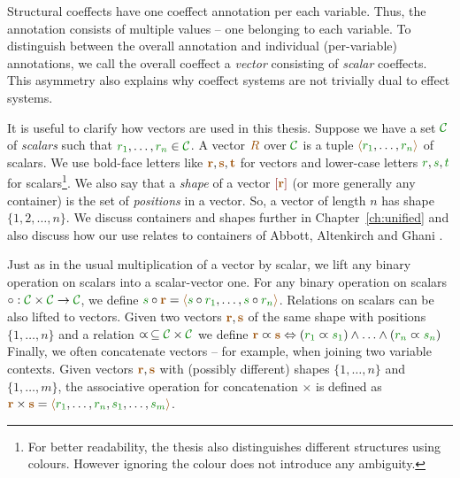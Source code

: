 Structural coeffects have one coeffect annotation per each variable. Thus, the annotation consists
of multiple values -- one belonging to each variable. To distinguish between the overall annotation
and individual (per-variable) annotations, we call the overall coeffect a \emph{vector} consisting of 
\emph{scalar} coeffects. This asymmetry also explains why coeffect systems are not trivially dual to 
effect systems.

It is useful to clarify how vectors are used in this thesis. Suppose we have a set $\C$ of
\emph{scalars} such that $\cclrd{r_1},\ldots,\cclrd{r_n} \in \C$. A vector $\aclrd{R}$ 
over $\C$ is a tuple $\alift{ \cclrd{r_1}, \ldots, \cclrd{r_n} }$ of scalars. 
We use bold-face letters like $\aclrd{\textbf{r}}, \aclrd{\textbf{s}}, \aclrd{\textbf{t}}$ for vectors and lower-case
letters $\cclrd{r},\cclrd{s},\cclrd{t}$ for scalars\footnote{For better readability, the thesis
also distinguishes different structures using colours. However ignoring the colour does not introduce 
any ambiguity.}. We also say that a \emph{shape} of a vector $\slift{\aclrd{\textbf{r}}}$ (or more generally any container) 
is the set of \emph{positions} in a vector. So, a vector of length $n$ has shape $\{ 1, 2, \ldots, n \}$. 
We discuss containers and shapes further in Chapter~\ref{ch:unified} and also discuss how our use
relates to containers of Abbott, Altenkirch and Ghani \cite{types-containers}.

Just as in the usual multiplication of a vector by scalar, we lift any binary operation on scalars into a 
scalar-vector one. For any binary operation on scalars $\circ : \C \times \C \rightarrow \C$, we define
 $\cclrd{s} \circ \aclrd{\textbf{r}} = \alift{ \cclrd{s}\circ\cclrd{r_1}, \ldots, \cclrd{s}\circ\cclrd{r_n}}$.
Relations on scalars can be also lifted to vectors. Given two vectors $\aclrd{\textbf{r}}, \aclrd{\textbf{s}}$ of the
same shape with positions $\{ 1, \ldots, n \}$ and a relation $\varpropto\, \subseteq \C \times \C$ we define 
$\aclrd{\textbf{r}} \varpropto \aclrd{\textbf{s}} \Leftrightarrow (\cclrd{r_1} \varpropto \cclrd{s_1}) \wedge \ldots \wedge (\cclrd{r_n} \varpropto \cclrd{s_n}) $
Finally, we often concatenate vectors -- for example, when joining two variable contexts.
Given vectors $\aclrd{\textbf{r}}, \aclrd{\textbf{s}}$ with (possibly different) shapes $\{ 1, \ldots, n \}$ and 
$\{ 1, \ldots, m \}$, the associative operation for concatenation $\times$ is defined as 
$\aclrd{\textbf{r}}\times\aclrd{\textbf{s}} = \alift{\cclrd{r_1},\ldots,\cclrd{r_n},\cclrd{s_1},\ldots,\cclrd{s_m}}$.

